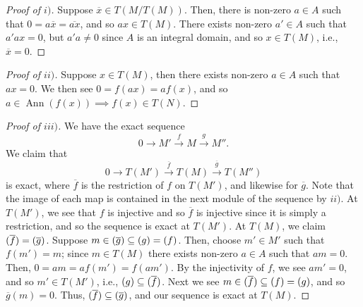 \documentclass[12pt,letterpaper]{article}
\theoremstyle{definition}
\theoremstyle{remark}
\numberwithin{figure}{problem}
\numberwithin{equation}{section}
\DeclareMathOperator{\Ann}{Ann}
\let\Im\relax
\DeclareMathOperator{\Im}{Im}
\let\ker\relax
\DeclareMathOperator{\ker}{Ker}
\begin{document}
\begin{proof}[Proof of $i)$]
  Suppose $\overline{x} \in T(M/T(M))$. Then, there is non-zero $a \in A$ such that $0 = a\overline{x} = \overline{ax}$, and so $ax \in T(M)$. There exists non-zero $a' \in A$ such that $a'ax = 0$, but $a'a \ne 0$ since $A$ is an integral domain, and so $x \in T(M)$, i.e., $\overline{x} = 0$.
\end{proof}
\begin{proof}[Proof of $ii)$]
  Suppose $x \in T(M)$, then there exists non-zero $a \in A$ such that $ax = 0$. We then see $0 = f(ax) = af(x)$, and so $a \in \Ann(f(x)) \implies f(x) \in T(N)$.
\end{proof}
\begin{proof}[Proof of $iii)$]
  We have the exact sequence
  \begin{equation*}
    0 \to M' \xrightarrow{f} M \xrightarrow{g} M''.
  \end{equation*}
  We claim that
  \begin{equation*}
    0 \to T(M') \xrightarrow{\overline{f}} T(M) \xrightarrow{\overline{g}} T(M'')
  \end{equation*}
  is exact, where $\overline{f}$ is the restriction of $f$ on $T(M')$, and likewise for $\overline{g}$. Note that the image of each map is contained in the next module of the sequence by $ii)$. At $T(M')$, we see that $f$ is injective and so $\overline{f}$ is injective since it is simply a restriction, and so the sequence is exact at $T(M')$. At $T(M)$, we claim $\Im(\overline{f}) = \ker(\overline{g})$. Suppose $m \in \ker(\overline{g}) \subseteq \ker(g) = \Im(f)$. Then, choose $m' \in M'$ such that $f(m') = m$; since $m \in T(M)$ there exists non-zero $a \in A$ such that $am = 0$. Then, $0 = am = af(m') = f(am')$. By the injectivity of $f$, we see $am' = 0$, and so $m' \in T(M')$, i.e., $\ker({g}) \subseteq \Im(\overline{f})$. Next we see $m \in \Im(\overline{f}) \subseteq \Im(f) = \ker(g)$, and so $\overline{g}(m) = 0$. Thus, $\Im(\overline{f}) \subseteq \ker(\overline{g})$, and our sequence is exact at $T(M)$.
\end{proof}
\end{document}
